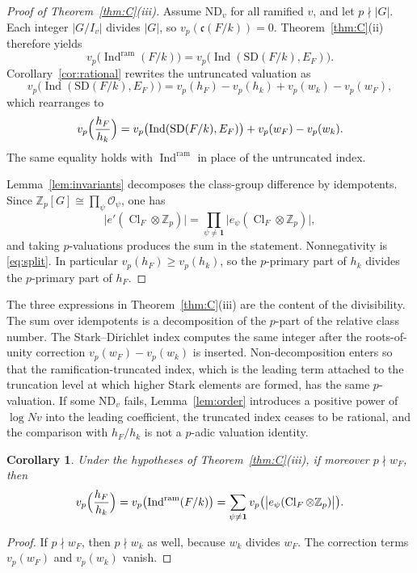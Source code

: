 \documentclass[11pt]{article}
\theoremstyle{plain}
\newtheorem{corollary}[theorem]{Corollary}
\theoremstyle{definition}
\theoremstyle{remark}
\newcommand{\Z}{\mathbb{Z}}
\newcommand{\OK}{\mathcal{O}}
\newcommand{\Cl}{\operatorname{Cl}}
\newcommand{\Ind}{\operatorname{Ind}}
\newcommand{\triv}{\mathbf{1}}
\newcommand{\ram}{\mathrm{ram}}
\newcommand{\SD}{\mathrm{SD}}
\begin{document}
\begin{proof}[Proof of Theorem~\ref{thm:C}(iii)]
Assume $\mathrm{ND}_v$ for all ramified $v$, and let $p\nmid|G|$.
Each integer $|G/I_v|$ divides $|G|$, so $v_p(\mathfrak{c}(F/k))=0$.
Theorem~\ref{thm:C}(ii) therefore yields
\[
  v_p\bigl(\Ind^{\ram}(F/k)\bigr)
  =v_p\bigl(\Ind(\SD(F/k),E_F)\bigr).
\]
Corollary~\ref{cor:rational} rewrites the untruncated valuation as
\[
  v_p\bigl(\Ind(\SD(F/k),E_F)\bigr)
  =v_p(h_F)-v_p(h_k)+v_p(w_k)-v_p(w_F),
\]
which rearranges to
\[
  v_p\Bigl(\frac{h_F}{h_k}\Bigr)
  =v_p\bigl(\Ind(\SD(F/k),E_F)\bigr)+v_p(w_F)-v_p(w_k).
\]
The same equality holds with $\Ind^{\ram}$ in place of the untruncated index.

Lemma~\ref{lem:invariants} decomposes the class-group difference by idempotents.
Since $\Z_p[G]\cong\prod_{\psi}\OK_{\psi}$, one has
\[
  \bigl|e'(\Cl_F\otimes\Z_p)\bigr|
  =\prod_{\psi\neq\triv}\bigl|e_{\psi}(\Cl_F\otimes\Z_p)\bigr|,
\]
and taking $p$-valuations produces the sum in the statement.
Nonnegativity is \eqref{eq:split}.
In particular $v_p(h_F)\ge v_p(h_k)$, so the $p$-primary part of $h_k$ divides the $p$-primary part of $h_F$.
\end{proof}

The three expressions in Theorem~\ref{thm:C}(iii) are the content of the divisibility.
The sum over idempotents is a decomposition of the $p$-part of the relative class number.
The Stark--Dirichlet index computes the same integer after the roots-of-unity correction $v_p(w_F)-v_p(w_k)$ is inserted.
Non-decomposition enters so that the ramification-truncated index, which is the leading term attached to the truncation level at which higher Stark elements are formed, has the same $p$-valuation.
If some $\mathrm{ND}_v$ fails, Lemma~\ref{lem:order} introduces a positive power of $\log Nv$ into the leading coefficient, the truncated index ceases to be rational, and the comparison with $h_F/h_k$ is not a $p$-adic valuation identity.

\begin{corollary}
\label{cor:unit-correction}
Under the hypotheses of Theorem~\ref{thm:C}(iii), if moreover $p\nmid w_F$, then
\[
  v_p\Bigl(\frac{h_F}{h_k}\Bigr)
  =v_p\bigl(\Ind^{\ram}(F/k)\bigr)
  =\sum_{\psi\neq\triv}v_p\bigl(\bigl|e_{\psi}(\Cl_F\otimes\Z_p)\bigr|\bigr).
\]
\end{corollary}

\begin{proof}
If $p\nmid w_F$, then $p\nmid w_k$ as well, because $w_k$ divides $w_F$.
The correction terms $v_p(w_F)$ and $v_p(w_k)$ vanish.
\end{proof}
\end{document}
